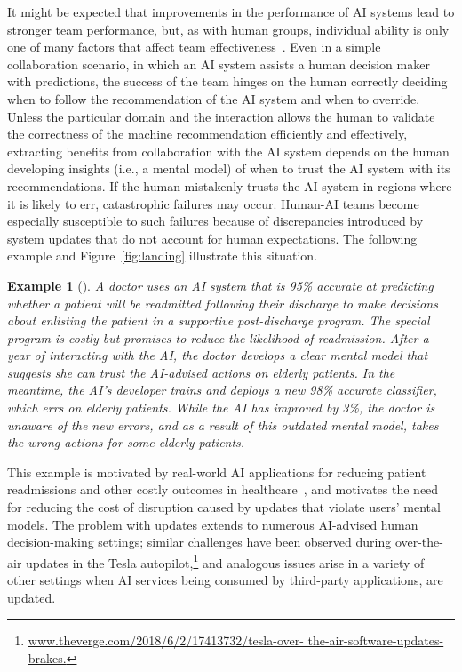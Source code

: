 \documentclass[letterpaper]{article}
\newtheorem*{example}{Example}
\begin{document}
It might be expected that improvements in the performance of AI systems lead to stronger team performance, but, as with human groups, individual ability is only one of many factors that affect team effectiveness~\cite{dechurch-jap10,grosz1996collaborative}. Even in a simple collaboration scenario, in which an AI system assists a human decision maker with predictions, the success of the team hinges on the human correctly deciding when to follow the recommendation of the AI system and when to override. Unless the particular domain and the interaction allows the human to validate the correctness of the machine recommendation efficiently and effectively, extracting benefits from collaboration with the AI system depends on the human developing insights (i.e., a mental model) of when to trust the AI system with its recommendations. If the human mistakenly trusts the AI system in regions where it is likely to err, catastrophic failures may occur. 
Human-AI teams become especially susceptible to such failures because of discrepancies introduced by system updates that do not account for human expectations. The following example and Figure~\ref{fig:landing} illustrate this situation.


\begin{example}[]
A doctor uses an AI system that is 95\% accurate at predicting whether a patient will be readmitted following their discharge to make decisions about enlisting the patient in a supportive post-discharge program. The special program is costly but promises to reduce the likelihood of readmission. After a year of interacting with the AI, the doctor develops a clear mental model that suggests she can trust the AI-advised actions on elderly patients. In the meantime, the AI's developer trains and deploys a new 98\% accurate classifier, which errs on elderly patients. 
While the AI has improved by 3\%, the doctor is unaware of the new errors, and as a result of this outdated mental model, takes the wrong actions for some elderly patients.
\end{example}

This example is motivated by real-world AI applications for reducing patient readmissions and other costly outcomes in healthcare~\cite{bayati2014data,wiens2016patient,caruana2015intelligible}, and motivates the need for reducing the cost of disruption caused by updates that violate  %
users' mental models. The problem with updates extends to numerous AI-advised human decision-making settings; similar challenges have been observed during over-the-air updates in the Tesla autopilot,\footnote{\url{www.theverge.com/2018/6/2/17413732/tesla-over- the-air-software-updates-brakes.}} and  analogous issues arise in a variety of other settings when AI services 
being consumed by third-party applications, are updated.
\end{document}
